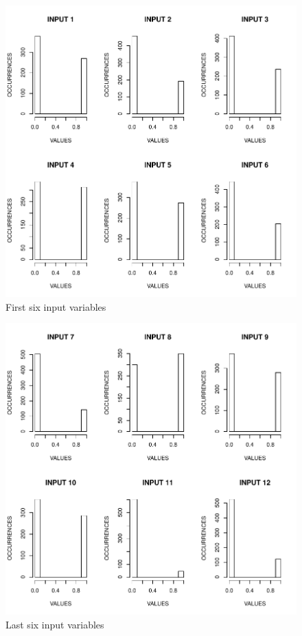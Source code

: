 \begin{figure}[h]
  \vspace{-0.2cm}
  \centering
  \includegraphics[width=0.7\columnwidth]{image/input1_6.pdf}
  \caption{First six input variables}
  \label{fig:input16}
\end{figure}

\begin{figure}[h]
  \vspace{-0.2cm}
  \centering
  \includegraphics[width=0.7\columnwidth]{image/input7_12.pdf}
  \caption{Last six input variables}
  \label{fig:input712}
\end{figure}

